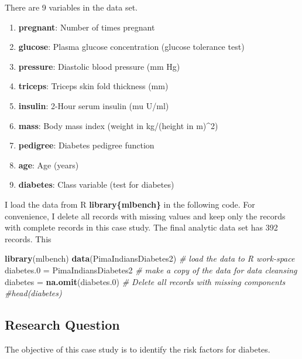 \documentclass[
]{book}
\newenvironment{Shaded}{\begin{snugshade}}{\end{snugshade}}
\newcommand{\CommentTok}[1]{\textcolor[rgb]{0.56,0.35,0.01}{\textit{#1}}}
\newcommand{\FloatTok}[1]{\textcolor[rgb]{0.00,0.00,0.81}{#1}}
\newcommand{\FunctionTok}[1]{\textcolor[rgb]{0.13,0.29,0.53}{\textbf{#1}}}
\newcommand{\NormalTok}[1]{#1}
\newcommand{\OtherTok}[1]{\textcolor[rgb]{0.56,0.35,0.01}{#1}}
\begin{document}
There are 9 variables in the data set.

\begin{enumerate}
\def\labelenumi{\arabic{enumi}.}
\item
  \textbf{pregnant}: Number of times pregnant
\item
  \textbf{glucose}: Plasma glucose concentration (glucose tolerance test)
\item
  \textbf{pressure}: Diastolic blood pressure (mm Hg)
\item
  \textbf{triceps}: Triceps skin fold thickness (mm)
\item
  \textbf{insulin}: 2-Hour serum insulin (mu U/ml)
\item
  \textbf{mass}: Body mass index (weight in kg/(height in m)\^{}2)
\item
  \textbf{pedigree}: Diabetes pedigree function
\item
  \textbf{age}: Age (years)
\item
  \textbf{diabetes}: Class variable (test for diabetes)
\end{enumerate}

I load the data from R \textbf{library\{mlbench\}} in the following code. For convenience, I delete all records with missing values and keep only the records with complete records in this case study. The final analytic data set has 392 records. This

\begin{Shaded}
\begin{Highlighting}[]
\FunctionTok{library}\NormalTok{(mlbench)}
\FunctionTok{data}\NormalTok{(PimaIndiansDiabetes2)           }\CommentTok{\# load the data to R work{-}space}
\NormalTok{diabetes}\FloatTok{.0} \OtherTok{=}\NormalTok{ PimaIndiansDiabetes2    }\CommentTok{\# make a copy of the data for data cleansing }
\NormalTok{diabetes }\OtherTok{=} \FunctionTok{na.omit}\NormalTok{(diabetes}\FloatTok{.0}\NormalTok{)       }\CommentTok{\# Delete all records with missing components}
\CommentTok{\#head(diabetes)}
\end{Highlighting}
\end{Shaded}

\hypertarget{research-question}{%
\subsection{Research Question}\label{research-question}}

The objective of this case study is to identify the risk factors for diabetes.
\end{document}
